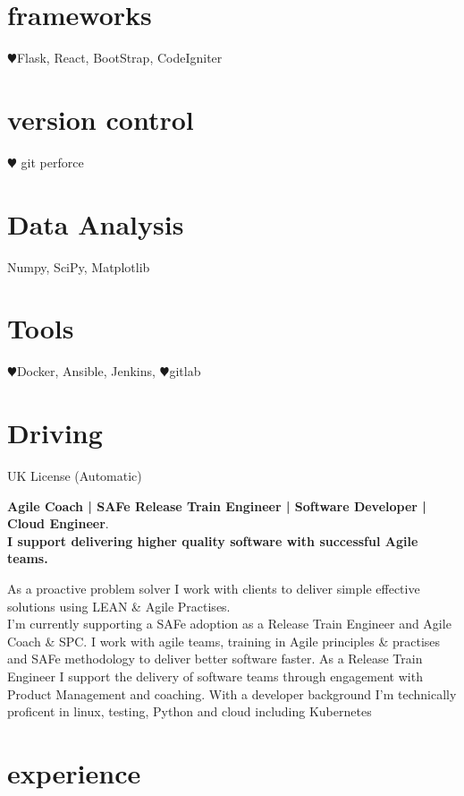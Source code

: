 \documentclass[]{cv-style}          %
\begin{document}
\begin{aside}
\section{frameworks}
{\color{red} $\varheartsuit$}Flask, React, BootStrap, CodeIgniter
\section{version control}
{\color{red} $\varheartsuit$} git perforce
\section{Data Analysis}
Numpy, SciPy, Matplotlib
\section{Tools}
{\color{red} $\varheartsuit$}Docker, Ansible, Jenkins, {\color{red} $\varheartsuit$}gitlab
\section{Driving}UK License (Automatic)
\end{aside}

\textbf{Agile Coach | SAFe Release Train Engineer | Software Developer | Cloud Engineer}.\\\textbf{I support delivering higher quality software with successful Agile teams.}\par
As a proactive problem solver I work with clients to deliver simple effective solutions using LEAN \& Agile Practises.\\
I'm currently supporting a SAFe adoption as a Release Train Engineer and Agile Coach \& SPC.
I work with agile teams, training in Agile principles \& practises and SAFe methodology to deliver better software faster. As a Release Train Engineer I support the delivery of software teams through engagement with Product Management and coaching.
With a developer background I'm technically proficent in linux, testing, Python and cloud including Kubernetes



\section{experience}
\end{document}

